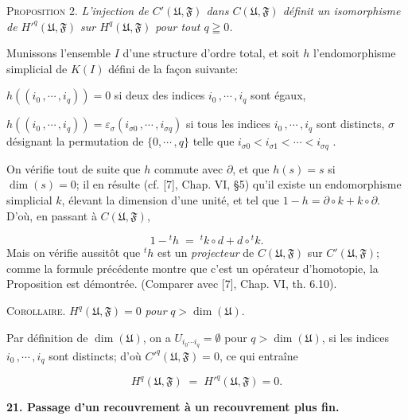 
\textsc{Proposition} 2. \textit{L'injection de $C'(\mathfrak{U}, \mathfrak{F})$ dans $C(\mathfrak{U}, \mathfrak{F})$ définit un isomorphisme de $H'^{q}(\mathfrak{U}, \mathfrak{F})$ sur $H^{q}(\mathfrak{U}, \mathfrak{F})$ pour tout $q \geqq 0$.}

Munissons l'ensemble $I$ d'une structure d'ordre total, et soit $h$ l'endomorphisme simplicial de $K(I)$ défini de la façon suivante:

$h((i_{0}\,, \cdots\,, i_{q})) = 0$ si deux des indices $i_{0}\,, \cdots\,, i_{q}$ sont égaux,

$h((i_{0}\,, \cdots\,, i_{q})) = \varepsilon_{\sigma}(i_{\sigma 0}\,, \cdots\,, i_{\sigma q})$ si tous les indices $i_{0}\,, \cdots\,, i_{q}$ sont distincts, $\sigma$ désignant la permutation de $\{0, \cdots\,, q\}$ telle que $i_{\sigma 0} < i_{\sigma 1} < \cdots < i_{\sigma q}$ .

On vérifie tout de suite que $h$ commute avec $\partial$, et que $h(s) = s$ si $\dim(s) = 0$; il en résulte (cf. [7], Chap. VI, \S5) qu'il existe un endomorphisme simplicial $k$, élevant la dimension d'une unité, et tel que $1 - h = \partial \circ k + k \circ \partial$. D'où, en passant à $C(\mathfrak{U}, \mathfrak{F})$,

\begin{equation*}
1 - {}^{t}h \;=\; {}^{t}k \circ d + d \circ {}^{t}k.
\end{equation*}
Mais on vérifie aussitôt que ${}^{t}h$ est un \textit{projecteur} de $C(\mathfrak{U}, \mathfrak{F})$ sur $C'(\mathfrak{U}, \mathfrak{F})$; comme la formule précédente montre que c'est un opérateur d'homotopie, la Proposition est démontrée. (Comparer avec [7], Chap. VI, th. 6.10).

\textsc{Corollaire}. $H^{q}(\mathfrak{U}, \mathfrak{F}) = 0$ \textit{pour} $q > \dim(\mathfrak{U})$.

Par définition de $\dim(\mathfrak{U})$, on a $U_{i_{0} \cdots i_{q}} = \emptyset$ pour $q > \dim(\mathfrak{U})$, si les indices $i_{0}\,, \cdots\,, i_{q}$ sont distincts; d'où $C'^{q}(\mathfrak{U}, \mathfrak{F}) = 0$, ce qui entraîne

\begin{equation*}
H^{q}(\mathfrak{U}, \mathfrak{F}) \;=\; H'^{q}(\mathfrak{U}, \mathfrak{F}) = 0.
\end{equation*}

\textbf{21. Passage d'un recouvrement à un recouvrement plus fin.}

